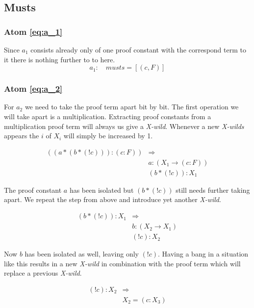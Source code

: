 \subsection{Musts}
\subsubsection[First atom]{Atom \ref{eq:a_1}}
Since $a_1$ consists already only of one proof constant with the correspond term to it there is nothing further to to here.
\begin{equation}
	a_1: \quad musts = [(c, F)]
\end{equation}

\subsubsection[First atom]{Atom \ref{eq:a_2}}
For $a_2$ we need to take the proof term apart bit by bit. The first operation we will take apart is a multiplication. Extracting proof constants from a multiplication proof term will always us give a \emph{X-wild}. Whenever a new \emph{X-wilds} appears the $i$ of $X_i$ will simply be increased by 1.

\begin{equation*}\label{eq:musts1_a_2}
	\begin{split}
		((a *(b* (! c))):(c:F)) & \Rightarrow \\
		& a : (X_1 \rightarrow (c:F)) \\
		& (b*(! c)): X_1
	\end{split}	
\end{equation*}

The proof constant $a$ has been isolated but $(b*(! c))$ still needs further taking apart. We repeat the step from above and introduce yet another \emph{X-wild}.

\begin{equation*}
	\begin{split}
	(b*(! c)): X_1 & \Rightarrow \\
	& b : (X_2 \rightarrow X_1) \\
	& (! c) : X_2
	\end{split}	
\end{equation*}

Now $b$ has been isolated as well, leaving only $(! c)$. Having a bang in a situation like this results in a new \emph{X-wild} in combination with the proof term which will replace a previous \emph{X-wild}.

\begin{equation*}
	\begin{split}
		(! c) : X_2 & \Rightarrow \\
		& X_2 = (c:X_3)
	\end{split}	
\end{equation*}

